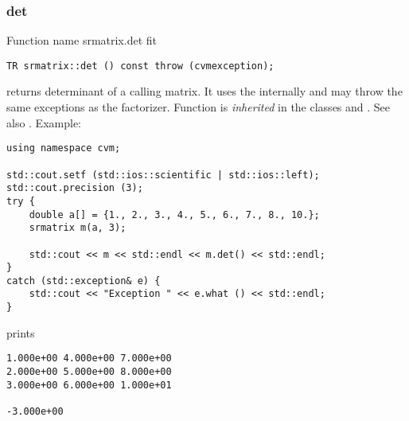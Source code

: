 \subsubsection{det}
Function%
\pdfdest name {srmatrix.det} fit
\begin{verbatim}
TR srmatrix::det () const throw (cvmexception);
\end{verbatim}
returns  determinant of a calling matrix.
It uses the  internally
and may throw the same exceptions as the factorizer.
Function is \emph{inherited} in the classes
and .
See also
.
Example:
\begin{Verbatim}
using namespace cvm;

std::cout.setf (std::ios::scientific | std::ios::left); 
std::cout.precision (3);
try {
    double a[] = {1., 2., 3., 4., 5., 6., 7., 8., 10.};
    srmatrix m(a, 3);

    std::cout << m << std::endl << m.det() << std::endl;
}
catch (std::exception& e) {
    std::cout << "Exception " << e.what () << std::endl;
}
\end{Verbatim}
prints
\begin{Verbatim}
1.000e+00 4.000e+00 7.000e+00
2.000e+00 5.000e+00 8.000e+00
3.000e+00 6.000e+00 1.000e+01

-3.000e+00
\end{Verbatim}
\newpage



